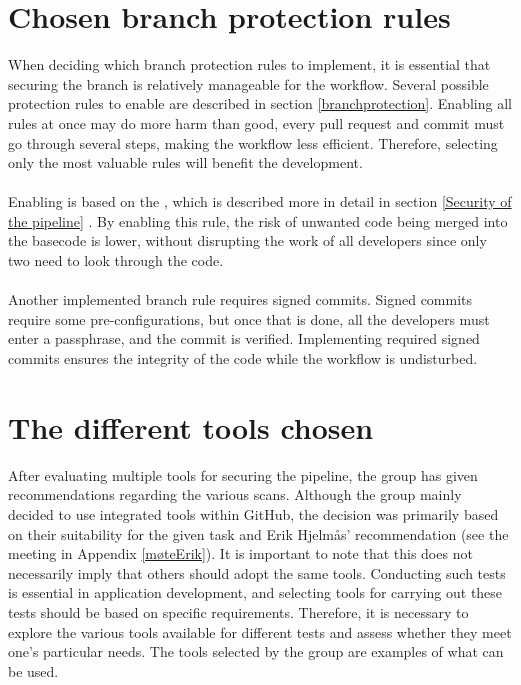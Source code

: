 \section{Chosen branch protection rules}
When deciding which branch protection rules to implement, it is essential that securing the branch is relatively manageable for the workflow. Several possible protection rules to enable are described in section \ref{branchprotection}. Enabling all rules at once may do more harm than good, every pull request and commit must go through several steps, making the workflow less efficient. Therefore, selecting only the most valuable rules will benefit the development. 
\\~\\
Enabling  is based on the , which is described more in detail in section \ref{Security of the pipeline} \cite{foureyes}. By enabling this rule, the risk of unwanted code being merged into the basecode is lower, without disrupting the work of all developers since only two need to look through the code. 
\\~\\
Another implemented branch rule requires signed commits. Signed commits require some pre-configurations, but once that is done, all the developers must enter a passphrase, and the commit is verified. Implementing required signed commits ensures the integrity of the code while the workflow is undisturbed.

\section{The different tools chosen}
After evaluating multiple tools for securing the pipeline, the group has given recommendations regarding the various scans. Although the group mainly decided to use integrated tools within GitHub, the decision was primarily based on their suitability for the given task and Erik Hjelmås' recommendation (see the meeting in Appendix \ref{møteErik}). It is important to note that this does not necessarily imply that others should adopt the same tools. Conducting such tests is essential in application development, and selecting tools for carrying out these tests should be based on specific requirements. Therefore, it is necessary to explore the various tools available for different tests and assess whether they meet one's particular needs. The tools selected by the group are examples of what can be used. 

